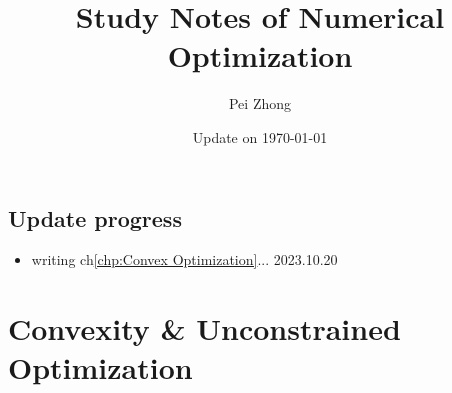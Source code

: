 \documentclass[12pt,oneside]{book} %
\begin{document}
\title{\bf \huge Study Notes of Numerical Optimization}
\author{Pei Zhong}
\date{Update on \today}

\maketitle


\tableofcontents

\begin{spacing}{1}

\chapter*{Update progress}
\begin{itemize}
    \item {writing ch\ref{chp:Convex Optimization}... \hfill 2023.10.20}
\end{itemize}









\part{Convexity \& Unconstrained Optimization}


















\end{spacing}
\end{document}
